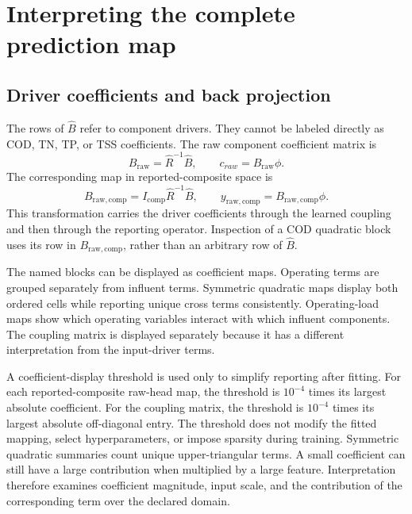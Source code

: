 \section{Interpreting the complete prediction map}

\subsection{Driver coefficients and back projection}

The rows of \(\widehat B\) refer to component drivers. They cannot be labeled directly as COD, TN, TP, or TSS coefficients. The raw component coefficient matrix is
\begin{equation}
\label{eq:icsor_raw_component_coefficients}
B_{\mathrm{raw}}=\widehat R^{-1}\widehat B,
\qquad c_{raw}=B_{\mathrm{raw}}\phi.
\end{equation}
The corresponding map in reported-composite space is
\begin{equation}
\label{eq:icsor_raw_composite_coefficients}
B_{\mathrm{raw,comp}}=I_{\mathrm{comp}}\widehat R^{-1}\widehat B,
\qquad y_{\mathrm{raw,comp}}=B_{\mathrm{raw,comp}}\phi.
\end{equation}
This transformation carries the driver coefficients through the learned coupling and then through the reporting operator. Inspection of a COD quadratic block uses its row in \(B_{\mathrm{raw,comp}}\), rather than an arbitrary row of \(\widehat B\).

The named blocks can be displayed as coefficient maps. Operating terms are grouped separately from influent terms. Symmetric quadratic maps display both ordered cells while reporting unique cross terms consistently. Operating-load maps show which operating variables interact with which influent components. The coupling matrix is displayed separately because it has a different interpretation from the input-driver terms.

A coefficient-display threshold is used only to simplify reporting after fitting. For each reported-composite raw-head map, the threshold is \(10^{-4}\) times its largest absolute coefficient. For the coupling matrix, the threshold is \(10^{-4}\) times its largest absolute off-diagonal entry. The threshold does not modify the fitted mapping, select hyperparameters, or impose sparsity during training. Symmetric quadratic summaries count unique upper-triangular terms. A small coefficient can still have a large contribution when multiplied by a large feature. Interpretation therefore examines coefficient magnitude, input scale, and the contribution of the corresponding term over the declared domain.

